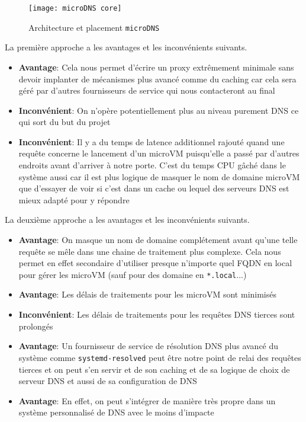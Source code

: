 \documentclass[12pt]{article}
\begin{document}
\begin{figure}[H]
	\centering
	\texttt{[image: microDNS core]}
	\caption{Architecture et placement \texttt{microDNS}}
	\label{microDNS:corearch}
\end{figure}

La première approche a les avantages et les inconvénients suivants.
\begin{itemize}
	\item \textbf{Avantage}: Cela nous permet d'écrire un proxy extrêmement minimale sans devoir implanter de mécanismes plus avancé comme du caching car cela sera géré par d'autres fournisseurs de service qui nous contacteront au final
	\item \textbf{Inconvénient}: On n'opère potentiellement plus au niveau purement DNS ce qui sort du but du projet
	\item \textbf{Inconvénient}: Il y a du temps de latence additionnel rajouté quand une requête concerne le lancement d'un microVM puisqu'elle a passé par d'autres endroits avant d'arriver à notre porte. C'est du temps CPU gâché dans le système aussi car il est plus logique de masquer le nom de domaine microVM que d'essayer de voir si c'est dans un cache ou lequel des serveurs DNS est mieux adapté pour y répondre
\end{itemize}

La deuxième approche a les avantages et les inconvénients suivants.
\begin{itemize}
	\item \textbf{Avantage}: On masque un nom de domaine complétement avant qu'une telle requête se mêle dans une chaine de traitement plus complexe. Cela nous permet en effet secondaire d'utiliser presque n'importe quel FQDN en local pour gérer les microVM (sauf pour des domaine en \texttt{*.local}...)
	\item \textbf{Avantage}: Les délais de traitements pour les microVM sont minimisés
	\item \textbf{Inconvénient}: Les délais de traitements pour les requêtes DNS tierces sont prolongés
	\item \textbf{Avantage}: Un fournisseur de service de résolution DNS plus avancé du système comme \texttt{systemd-resolved} peut être notre point de relai des requêtes tierces et on peut s'en servir et de son caching et de sa logique de choix de serveur DNS et aussi de sa configuration de DNS
	\item \textbf{Avantage}: En effet, on peut s'intégrer de manière très propre dans un système personnalisé de DNS avec le moins d'impacte
\end{itemize}
\end{document}
